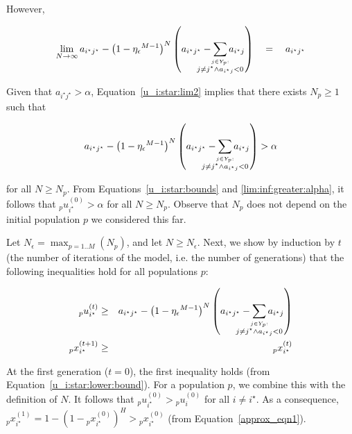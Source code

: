 \documentclass{sig-alt-full}
\def\clap#1{\hbox to 0pt{\hss#1\hss}}
\def\mathclap{\mathpalette\mathclapinternal}
\def\mathclapinternal#1#2{%
	\clap{$\mathsurround=0pt#1{#2}$}}
\newcommand\laxsumb[2]{\displaystyle\sum_{\mathclap{\stackrel{{#1} :}{#2}}}}
\begin{document}
\vspace{10in}
\begin{multicols}{2}
\noindent However,

\begin{equation}
\lim_{N \rightarrow \infty} a_{i^\star j^\star} - \left( 1 - {\eta_\epsilon}^{M-1} \right) ^N \left( a_{i^\star j^\star}  - \laxsumb{j \in Y_{p}}{j \neq j^\star \wedge a_{i^\star j} < 0} { a_{i^\star j} } \right) \quad = \quad a_{i^\star j^\star} \label{u_i:star:lim2}
\end{equation}

\vspace{0.5em}Given that $a_{i^\star j^\star} > \alpha$, Equation~\ref{u_i:star:lim2} implies that there exists $N_p \geq 1$ such that

\begin{equation}
a_{i^\star j^\star} - \left( 1 - {\eta_\epsilon}^{M-1} \right) ^N \left( a_{i^\star j^\star}  - \laxsumb{j \in Y_{p}}{j \neq j^\star \wedge a_{i^\star j} < 0} { a_{i^\star j} } \right) > \alpha \label{lim:inf:greater:alpha}
\end{equation}

\vspace{0.5em}\noindent for all $N \geq N_p$.  From Equations~\ref{u_i:star:bounds} and \ref{lim:inf:greater:alpha}, it follows that ${_p}u^{(0)}_{i^\star} > \alpha$ for all $N \geq N_p$.  Observe that $N_p$ does not depend on the initial population $p$ we considered this far.

Let $N_\epsilon = \max_{p=1..M} \left( N_p \right)$, and let $N \geq N_\epsilon$.  Next, we show by induction by $t$ (the number of iterations of the model, i.e. the number of generations) that the following inequalities hold for all populations $p$:

\begin{eqnarray*}
{_p}u^{(t)}_{i^\star} & \geq & a_{i^\star j^\star} - \left( 1 - {\eta_\epsilon}^{M-1} \right) ^N \left( a_{i^\star j^\star}  - \laxsumb{j \in Y_{p}}{j \neq j^\star \wedge a_{i^\star j} < 0} { a_{i^\star j} } \right)\\
{_p}x^{(t+1)}_{i^\star} & \geq & {_p}x^{(t)}_{i^\star}\\
\end{eqnarray*}

At the first generation ($t=0$), the first inequality holds (from Equation~\ref{u_i:star:lower:bound}).  For a population $p$, we combine this with the definition of $N$.  It follows that ${_p}u^{(0)}_{i^\star} > {_p}u^{(0)}_i$ for all $i \neq i^\star$.  As a consequence, ${_p}x^{(1)}_{i^\star} = 1 - ( 1 - {_p}x^{(0)}_{i^\star} )^H > {_p}x^{(0)}_{i^\star}$ (from Equation~\ref{approx_eqn1}).


\end{multicols}
\end{document}
